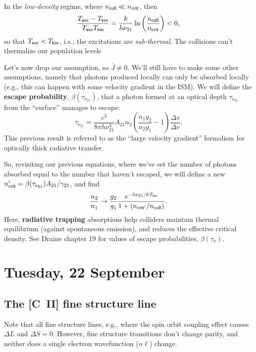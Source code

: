 \documentclass{tufte-handout}
\renewcommand{\textbf}[1]{{\bf \textcolor{dark-gray}{#1}}}
\renewcommand{\rm}{\sf}
\renewcommand{\smallcaps}[1]{{\smaller~\textsc{#1}}}
\newcommand{\spec}[2]{\textnormal{#1}\smallcaps{#2}} %
\begin{document}
In the \textit{low-density} regime, where $n_{\rm coll} \ll n_{\rm crit}$, then
\[\frac{T_{\rm exc}-T_{\rm kin}}{T_{\rm exc}T_{\rm kin}} = \frac{k}{h\nu_{21}}\ln\left (\frac{n_{\rm coll}}{n_{\rm crit}}\right ) < 0,\]
so that $T_{\rm exc} < T_{\rm kin}$, i.e., the excitations are \textit{sub-thermal}. The collisions can't thermalize our population levels

Let's now drop our assumption, so $\bar J \neq 0$. We'll still have to make some other assumptions, namely that photons produced locally can only be absorbed locally (e.g., this can happen with some velocity gradient in the ISM). We will define the \textbf{escape probability}, $\beta(\tau_{\nu_{21}})$, that a photon formed at an optical depth $\tau_{\nu_{21}}$ from the ``surface'' manages to escape:
\begin{equation}
\tau_{\nu_{21}} = \frac{c^3}{8\pi h\nu_{21}^3} A_{21} n_2 \left (\frac{n_1g_2}{n_2g_1} - 1\right )\frac{\Delta s}{\Delta v}.
\end{equation}
This previous result is referred to as the ``large velocity gradient'' formalism for optically thick radiative transfer.

So, revisiting our previous equations, where we've set the number of photons absorbed equal to the number that haven't escaped, we will define a new $n_{\rm crit}' = \beta(\tau_{\nu_{21}})A_{21}/ \gamma_{21}$, and find
\begin{equation}
\frac{n_2}{n_1} \rightarrow \frac{g_2}{g_1}\frac{e^{-h\nu_{21} / kT_{\rm kin}}}{1+ (n_{\rm crit'} / n_{\rm coll})}.
\end{equation}
Here, \textbf{radiative trapping} absorptions help colliders maintain thermal equilibrium (against spontaneous emission), and reduces the effective critical density.
See Draine chapter 19 for values of escape probabilities, $\beta(\tau_{\nu})$.


\section{Tuesday, 22 September}

\subsection{The [\spec{C}{II}] fine structure line}
Note that all fine structure lines, e.g., where the spin orbit coupling effect causes $\Delta L$ and $\Delta S = 0$. However, fine structure transitions don't change parity, and neither does a single electron wavefunction ($n\ell$) change.
\end{document}
